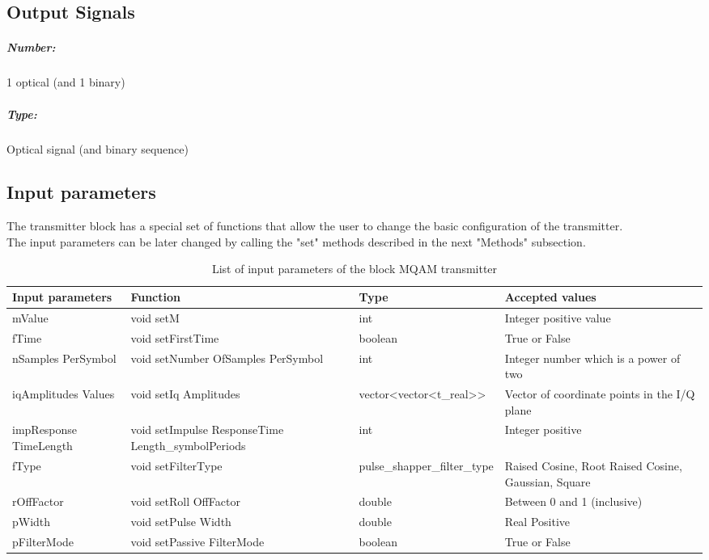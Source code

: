 \subsection*{Output Signals}

\subparagraph*{Number:} 1 optical (and 1 binary)

\subparagraph*{Type:} Optical signal (and binary sequence)

\subsection*{Input parameters}

The transmitter block has a special set of functions that allow the user to change the basic configuration of the transmitter. \\
The input parameters can be later changed by calling the "set" methods described in the next "Methods" subsection.
\begin{table}[H]
\centering
\begin{center}
	\begin{tabular}{| p{3cm} | p{5cm} | p{3cm} | p{4cm} | }
		\hline
		\textbf{Input parameters} & \textbf{Function} & Type & \textbf{Accepted values} \\ \hline
        mValue & void setM & int & Integer positive value\\
        \hline
		fTime & void setFirstTime & boolean & True or False\\
        \hline
		nSamples PerSymbol & void setNumber OfSamples PerSymbol & int & Integer number which is a power of two\\
        \hline
        iqAmplitudes Values & void setIq Amplitudes & vector<vector<t\_real>> & Vector of coordinate points in the I/Q plane \\
        \hline
        impResponse TimeLength & void setImpulse ResponseTime Length\_symbolPeriods & int & Integer positive\\
		\hline
        fType & void setFilterType & pulse\_shapper\_filter\_type  & Raised Cosine, Root Raised Cosine, Gaussian, Square\\
        \hline
        rOffFactor & void setRoll OffFactor & double & Between 0 and 1 (inclusive) \\
        \hline
        pWidth & void setPulse Width & double & Real Positive\\
        \hline
        pFilterMode & void setPassive FilterMode & boolean & True or False\\
		\hline
	\end{tabular}
	\caption{List of input parameters of the block MQAM transmitter} \label{table}
\end{center}
\end{table}
\pagebreak

